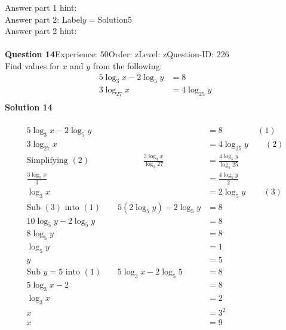 \documentclass{article}
\begin{document}
Answer part 1 hint: \hspace{15pt}\\
Answer part 2: \hspace{10pt}Label\hspace{10pt}$y=$\hspace{10pt}Solution\hspace{10pt}5\\
Answer part 2 hint: \hspace{15pt}\\
\\[4pt]
\noindent\textbf{Question 14}\hspace{20pt}Experience: 50\hspace{20pt}Order: z\hspace{20pt}Level: z\hspace{20pt}Question-ID: 226\\[2pt]
Find values for $x$ and $y$ from the following:
\begin{align*}
5\log_{3}x-2\log_{5}y&=8\\[2pt]
3\log_{27}x&=4\log_{25}y\\[-22pt]
\end{align*}
\noindent\textbf{Solution 14}\\[2pt]
\\[-35pt]\begin{align*}
5\log_{3}x-2\log_{5}y&=8\hspace{50pt} (1)\\[2pt]
3\log_{27}x&=4\log_{25}y\qquad (2)\\[2pt]
\text{Simplifying} \,\,(2) \hspace{77pt} \displaystyle\frac{3\log_{3}x}{\log_{3}27}&=\displaystyle\frac{4\log_{5}y}{\log_{5}25}\\[2pt]
\displaystyle\frac{3\log_{3}x}{3}&=\displaystyle\frac{4\log_{5}y}{2}\\[2pt]
\log_{3}x&=2\log_{5}y\hspace{26pt} (3)\\[2pt]
\text{Sub}\,\,(3)\,\, \text{into}\,\,(1)\qquad 5(2\log_{5}y)-2\log_{5}y&=8\\[2pt]
10\log_{5}y-2\log_{5}y&=8\\[2pt]
8\log_{5}y&=8\\[2pt]
\log_{5}y&=1\\[2pt]
y&=5\\[12pt]
\text{Sub}\,\,y=5\,\,\text{into}\,\,(1)\hspace{23pt} 5\log_{3}x-2\log_{5}5&=8\\[2pt]
5\log_{3}x-2&=8\\[2pt]
\log_{3}x&=2\\[2pt]
x&=3^2\\[2pt]
x&=9
\end{align*}
\end{document}
